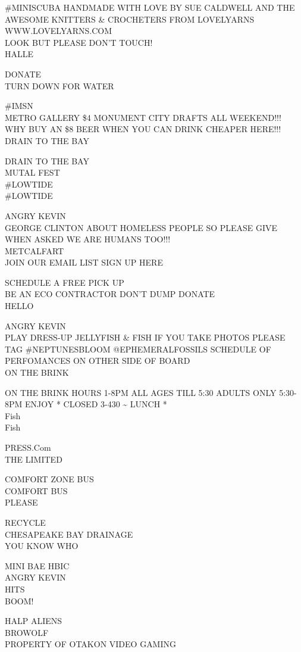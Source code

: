 \documentclass[10pt,letterpaper]{article}
\begin{document}
\#MINISCUBA HANDMADE WITH LOVE BY SUE CALDWELL AND THE AWESOME KNITTERS \& CROCHETERS FROM LOVELYARNS WWW.LOVELYARNS.COM\\
LOOK BUT PLEASE DON'T TOUCH!\\
HALLE

DONATE\\
TURN DOWN FOR WATER

\#IMSN\\
METRO GALLERY \$4 MONUMENT CITY DRAFTS ALL WEEKEND!!!  WHY BUY AN \$8 BEER WHEN YOU CAN DRINK CHEAPER HERE!!!\\
DRAIN TO THE BAY

DRAIN TO THE BAY\\
MUTAL FEST\\
\#LOWTIDE\\
\#LOWTIDE

ANGRY KEVIN\\
GEORGE CLINTON ABOUT HOMELESS PEOPLE SO PLEASE GIVE WHEN ASKED WE ARE HUMANS TOO!!!\\
METCALFART\\
JOIN OUR EMAIL LIST SIGN UP HERE

SCHEDULE A FREE PICK UP\\
BE AN ECO CONTRACTOR DON'T DUMP DONATE\\
HELLO

ANGRY KEVIN\\
PLAY DRESS{-}UP JELLYFISH \& FISH IF YOU TAKE PHOTOS PLEASE TAG \#NEPTUNESBLOOM @EPHEMERALFOSSILS SCHEDULE OF PERFOMANCES ON OTHER SIDE OF BOARD\\
ON THE BRINK

ON THE BRINK HOURS 1{-}8PM ALL AGES TILL 5:30 ADULTS ONLY 5:30{-}8PM ENJOY * CLOSED 3{-}430 \textasciitilde{} LUNCH *\\
Fish\\
Fish

PRESS.Com\\
THE LIMITED

COMFORT ZONE BUS\\
COMFORT BUS\\
PLEASE

RECYCLE\\
CHESAPEAKE BAY DRAINAGE\\
YOU KNOW WHO

MINI BAE HBIC\\
ANGRY KEVIN\\
HITS\\
BOOM!

HALP ALIENS\\
BROWOLF\\
PROPERTY OF OTAKON VIDEO GAMING
\end{document}
